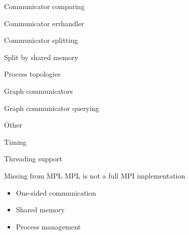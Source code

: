\documentclass[10pt]{beamer}
\begin{document}
\begin{numberedframe}{Communicator comparing}
  
\end{numberedframe}
\begin{numberedframe}{Communicator errhandler}
  
\end{numberedframe}
\begin{numberedframe}{Communicator splitting}
  
\end{numberedframe}
\begin{numberedframe}{Split by shared memory}
  
\end{numberedframe}

 {Process topologies}

\begin{numberedframe}{Graph communicators}
  
\end{numberedframe}
\begin{numberedframe}{Graph communicator querying}
  
\end{numberedframe}

 {Other}

\begin{numberedframe}{Timing}
  
\end{numberedframe}

\begin{numberedframe}{Threading support}
  
\end{numberedframe}

\begin{frame}{Missing from MPL}
  MPL is not a full MPI implementation
  \begin{itemize}
  \item One-sided communication
  \item Shared memory
  \item Process management
  \end{itemize}
\end{frame}
\end{document}

